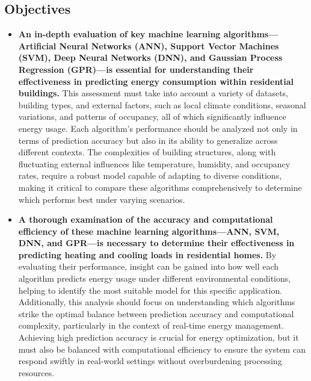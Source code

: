 \documentclass[a4paper, 12pt]{article}
\begin{document}
\subsection{Objectives}
\begin {itemize}
    \item \textbf{An in-depth evaluation of key machine learning algorithms—Artificial Neural Networks (ANN), Support Vector Machines (SVM), Deep Neural Networks (DNN), and Gaussian Process Regression (GPR)—is essential for understanding their effectiveness in predicting energy consumption within residential buildings.} This assessment must take into account a variety of datasets, building types, and external factors, such as local climate conditions, seasonal variations, and patterns of occupancy, all of which significantly influence energy usage. Each algorithm's performance should be analyzed not only in terms of prediction accuracy but also in its ability to generalize across different contexts. The complexities of building structures, along with fluctuating external influences like temperature, humidity, and occupancy rates, require a robust model capable of adapting to diverse conditions, making it critical to compare these algorithms comprehensively to determine which performs best under varying scenarios.
    \item \textbf{A thorough examination of the accuracy and computational efficiency of these machine learning algorithms—ANN, SVM, DNN, and GPR—is necessary to determine their effectiveness in predicting heating and cooling loads in residential homes.} By evaluating their performance, insight can be gained into how well each algorithm predicts energy usage under different environmental conditions, helping to identify the most suitable model for this specific application. Additionally, this analysis should focus on understanding which algorithms strike the optimal balance between prediction accuracy and computational complexity, particularly in the context of real-time energy management. Achieving high prediction accuracy is crucial for energy optimization, but it must also be balanced with computational efficiency to ensure the system can respond swiftly in real-world settings without overburdening processing resources.

\end{itemize}
\end{document}
